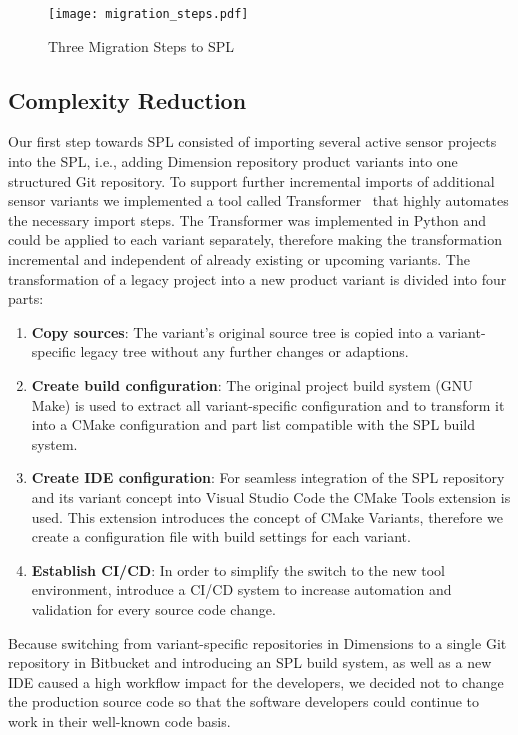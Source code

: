 \begin{figure*}[ht]
  \centering
  \texttt{[image: migration\_steps.pdf]}
  \caption{Three Migration Steps to SPL}
  \label{fig:threeMigrationSteps}
\end{figure*}

\subsection{Complexity Reduction}\label{complexity}

Our first step towards SPL consisted of importing several active sensor projects into
the SPL, i.e., adding Dimension repository product variants into one structured Git
repository. To support further incremental imports of additional sensor variants
we implemented a tool called Transformer~\cite{GithubTransformer} that highly
automates the necessary import steps. The Transformer was implemented in Python
and could be applied to each variant separately, therefore making the transformation
incremental and independent of already existing or upcoming variants. The transformation
of a legacy project into a new product variant is divided into four parts:

\begin{enumerate}
  \item \textbf{Copy sources}: The variant's original source tree is copied
        into a variant-specific legacy tree without any further changes or
        adaptions.
  \item \textbf{Create build configuration}: The original project build
        system (GNU Make) is used to extract all variant-specific configuration and
        to transform it into a CMake configuration and part list compatible with
        the SPL build system.
  \item \textbf{Create IDE configuration}: For seamless integration of the SPL
        repository and its variant concept into Visual Studio Code the
        CMake Tools extension is used. This extension introduces the concept of CMake
        Variants, therefore we create a configuration file with build settings
        for each variant.
  \item \textbf{Establish CI/CD}: In order to simplify the switch to the new
        tool environment, introduce a CI/CD system to increase automation and
        validation for every source code change.
\end{enumerate}

Because switching from variant-specific repositories in Dimensions to a single
Git repository in Bitbucket and introducing an SPL build system, as well as a
new IDE caused a high workflow impact for the developers, we decided not to
change the production source code so that the software developers could continue
to work in their well-known code basis.

